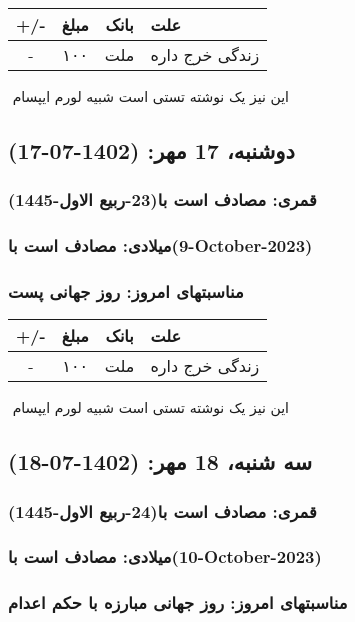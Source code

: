 \documentclass{article}
\newcommand{\rnote}[1]{\marginpar{\textcolor{color}{\StrSubstitute{\##1}{ }{\_}}}}
\newcommand{\myRow}[4]{
    #1 & #2 & #3 & #4 \\ \hline
}
\begin{document}
\begin{tabular}{ | c | c | c | p{5cm} |}
    \hline
    \myRow{ +/- }{مبلغ}{بانک}{علت}
    \myRow{-}{۱۰۰}{ملت}{زندگی خرج داره}
\end{tabular}
\newline
\newline

‌
\rnote{تست}
این نیز یک نوشته تستی است شبیه لورم ایپسام




\newpage
{}
\textcolor{color}{
\section{ دوشنبه، 17 مهر: (1402-07-17) }
\subsubsection*{قمری: مصادف است با(23-ربیع الاول-1445)} 
\subsubsection*{میلادی: مصادف است با(9-October-2023)}
\subsubsection*{مناسبتهای امروز: روز جهانی پست}
}


\begin{tabular}{ | c | c | c | p{5cm} |}
    \hline
    \myRow{ +/- }{مبلغ}{بانک}{علت}
    \myRow{-}{۱۰۰}{ملت}{زندگی خرج داره}
\end{tabular}
\newline
\newline

‌
\rnote{تست}
این نیز یک نوشته تستی است شبیه لورم ایپسام




\newpage
{}
\textcolor{color}{
\section{ سه شنبه، 18 مهر: (1402-07-18) }
\subsubsection*{قمری: مصادف است با(24-ربیع الاول-1445)} 
\subsubsection*{میلادی: مصادف است با(10-October-2023)}
\subsubsection*{مناسبتهای امروز: روز جهانی مبارزه با حکم اعدام}
}
\end{document}
